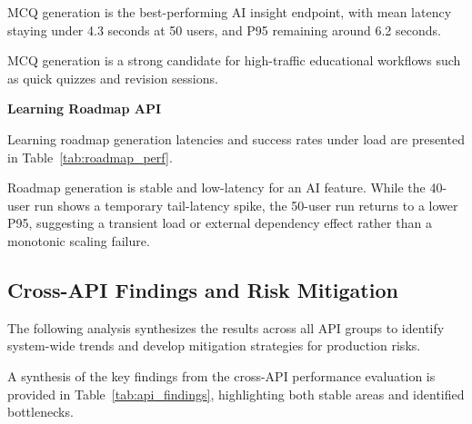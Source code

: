 MCQ generation is the best-performing AI insight endpoint, with mean latency staying under 4.3 seconds at 50 users, and P95 remaining around 6.2 seconds.

MCQ generation is a strong candidate for high-traffic educational workflows such as quick quizzes and revision sessions.

\textbf{Learning Roadmap API}

Learning roadmap generation latencies and success rates under load are presented in Table~\ref{tab:roadmap_perf}.

\begin{table}[H]
    \centering
    \caption{Learning Roadmap Performance Matrix.}
    \label{tab:roadmap_perf}
\end{table}

Roadmap generation is stable and low-latency for an AI feature. While the 40-user run shows a temporary tail-latency spike, the 50-user run returns to a lower P95, suggesting a transient load or external dependency effect rather than a monotonic scaling failure.

\subsection{Cross-API Findings and Risk Mitigation}

The following analysis synthesizes the results across all API groups to identify system-wide trends and develop mitigation strategies for production risks.

A synthesis of the key findings from the cross-API performance evaluation is provided in Table~\ref{tab:api_findings}, highlighting both stable areas and identified bottlenecks.

